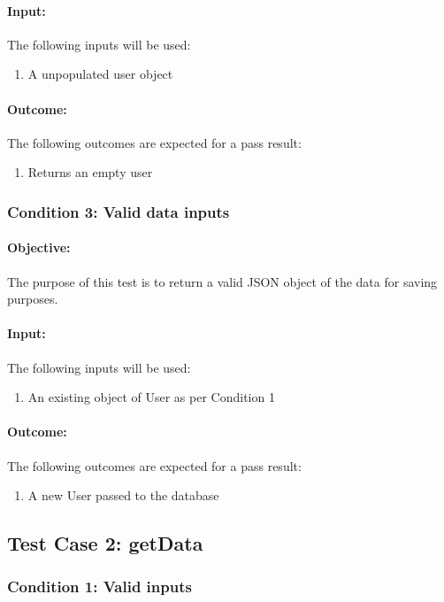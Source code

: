 \documentclass{article}
\begin{document}
\paragraph{Input:} The following inputs will be used:
\begin{enumerate}
	\item A unpopulated user object
\end{enumerate}
\paragraph{Outcome:} The following outcomes are expected for a pass result:
\begin{enumerate}
	\item Returns an empty user
\end{enumerate}
\subsubsection{Condition 3: Valid data inputs}
\paragraph{Objective:} The purpose of this test is to return a valid JSON object of the data for saving purposes.
\paragraph{Input:} The following inputs will be used:
\begin{enumerate}
	\item An existing object of User as per Condition 1
\end{enumerate}
\paragraph{Outcome:} The following outcomes are expected for a pass result:
\begin{enumerate}
	\item A new User passed to the database
\end{enumerate}

\subsection{Test Case 2: getData}\label{test2}
\subsubsection{Condition 1: Valid inputs }
\end{document}
